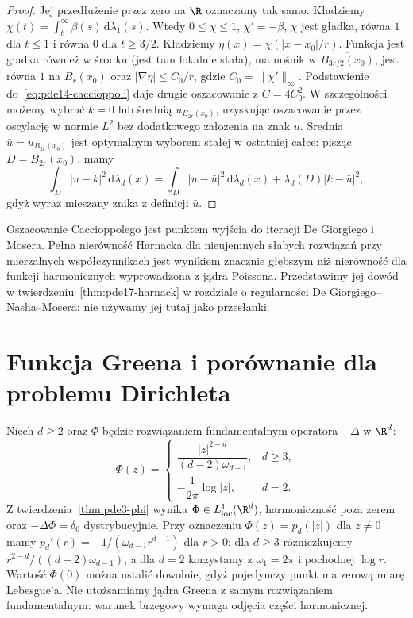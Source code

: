 \begin{proof}
Jej przedłużenie przez zero na $\R$ oznaczamy tak samo.
Kładziemy $\chi(t)=\int_t^\infty\beta(s)\,\mathrm d\lambda_1(s)$.
Wtedy $0\le\chi\le1$, $\chi'=-\beta$, $\chi$ jest gładka,
równa $1$ dla $t\le1$ i równa $0$ dla $t\ge3/2$.
Kładziemy $\eta(x)=\chi(|x-x_0|/r)$.
Funkcja jest gładka również w środku (jest tam lokalnie
stała), ma nośnik w $\overline{B_{3r/2}(x_0)}$,
jest równa $1$ na $B_r(x_0)$ oraz
$|\nabla\eta|\le C_0/r$, gdzie $C_0=\|\chi'\|_\infty$.
Podstawienie do~\eqref{eq:pde14-caccioppoli} daje
drugie oszacowanie z $C=4C_0^2$.
W szczególności możemy wybrać $k=0$ lub średnią
$u_{B_{2r}(x_0)}$, uzyskując oszacowanie przez oscylację
w normie $L^2$ bez dodatkowego założenia na znak $u$.
Średnia $\bar u=u_{B_{2r}(x_0)}$ jest optymalnym wyborem
stałej w ostatniej całce: pisząc $D=B_{2r}(x_0)$, mamy
\[
 \int_D |u-k|^2\,\mathrm d\lambda_d(x)
 =\int_D |u-\bar u|^2\,\mathrm d\lambda_d(x)
  +\lambda_d(D)|k-\bar u|^2,
\]
gdyż wyraz mieszany znika z definicji $\bar u$.
\end{proof}

\begin{uwaga}
Oszacowanie Caccioppolego jest punktem wyjścia do iteracji
De Giorgiego i Mosera. Pełna nierówność Harnacka dla
nieujemnych słabych rozwiązań przy mierzalnych współczynnikach
jest wynikiem znacznie głębszym niż nierówność dla funkcji
harmonicznych wyprowadzona z jądra Poissona. Przedstawimy
jej dowód w twierdzeniu~\ref{thm:pde17-harnack}
w rozdziale o regularności De Giorgiego--Nasha--Mosera;
nie używamy jej tutaj jako przesłanki.
\end{uwaga}

\section{Funkcja Greena i porównanie dla problemu Dirichleta}
\label{sec:pde14-green}
Niech $d\ge2$ oraz $\Phi$ będzie rozwiązaniem fundamentalnym
operatora $-\Delta$ w $\R^d$:
\[
 \Phi(z)=\begin{cases}
 \dfrac{|z|^{2-d}}{(d-2)\omega_{d-1}},&d\ge3,\\[4pt]
 -\dfrac1{2\pi}\log|z|,&d=2.
 \end{cases}
\]
Z twierdzenia~\ref{thm:pde3-phi} wynika
$\Phi\in L^1_{\mathrm{loc}}(\R^d)$, harmoniczność poza
zerem oraz $-\Delta\Phi=\delta_0$ dystrybucyjnie.
Przy oznaczeniu $\Phi(z)=p_d(|z|)$ dla $z\ne0$ mamy
$p_d'(r)=-1/(\omega_{d-1}r^{d-1})$ dla $r>0$:
dla $d\ge3$ różniczkujemy $r^{2-d}/((d-2)\omega_{d-1})$,
a dla $d=2$ korzystamy z $\omega_1=2\pi$ i pochodnej
$\log r$. Wartość $\Phi(0)$ można ustalić dowolnie,
gdyż pojedynczy punkt ma zerową miarę Lebesgue'a.
Nie utożsamiamy jądra Greena z samym rozwiązaniem
fundamentalnym: warunek brzegowy wymaga odjęcia części
harmonicznej.

